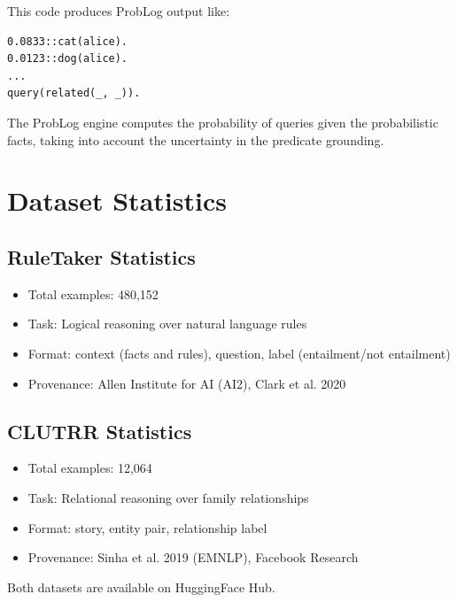 \documentclass[11pt,letterpaper]{article}
\begin{document}
This code produces ProbLog output like:

\begin{lstlisting}[basicstyle=\ttfamily\small, frame=single]
0.0833::cat(alice).
0.0123::dog(alice).
...
query(related(_, _)).
\end{lstlisting}

The ProbLog engine computes the probability of queries given the probabilistic facts, taking into account the uncertainty in the predicate grounding.

\section{Dataset Statistics}

\subsection{RuleTaker Statistics}
\begin{itemize}[noitemsep]
\item Total examples: 480,152
\item Task: Logical reasoning over natural language rules
\item Format: context (facts and rules), question, label (entailment/not entailment)
\item Provenance: Allen Institute for AI (AI2), Clark et al. 2020 \cite{Clark2020}
\end{itemize}

\subsection{CLUTRR Statistics}
\begin{itemize}[noitemsep]
\item Total examples: 12,064
\item Task: Relational reasoning over family relationships
\item Format: story, entity pair, relationship label
\item Provenance: Sinha et al. 2019 (EMNLP), Facebook Research \cite{Sinha2019}
\end{itemize}

Both datasets are available on HuggingFace Hub.
\end{document}
